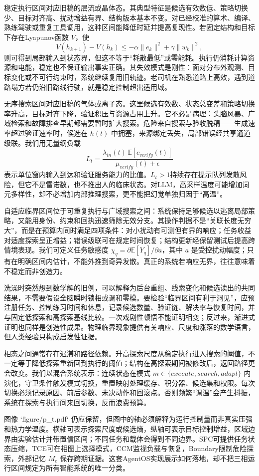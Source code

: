 稳定执行区间对应旧稿的层流或晶体态。其典型特征是候选有效数低、策略切换少、目标对齐高、扰动增益有界、结构版本基本不变。对已经校准的算术、编译、熟练驾驶或重复工具调用，这种区间能降低时延并提高复现性。若固定结构和目标下存在Lyapunov函数 $V$，使
\[
 V(h_{k+1})-V(h_k)\le-\alpha\|e_k\|^2+\gamma\|w_k\|^2,
\]
则可得到局部输入到状态界，但这不等于“耗散最低”或零能耗。执行仍消耗计算资源和电能，稳定也不保证输出事实正确。其失效模式是刚性：面对分布外观测、目标变化或不可行约束时，系统继续复用旧轨迹。老司机在熟悉道路上高效，遇到道路塌方若仍沿旧路线行驶，就是稳定控制超出适用域。

无序搜索区间对应旧稿的气体或离子态。这里候选有效数、状态总变差和策略切换率升高，目标对齐下降，验证积压与资源占用上升。它不必是病理：头脑风暴、广域检索和故障排查早期都需要暂时扩大搜索。危险来自搜索与验收脱耦——生成速率超过验证速率时，候选在 $h(t)$ 中拥塞，来源绑定丢失，局部错误经共享通道级联。我们用无量纲负载
\[
 L_t=\frac{\lambda_{in}(t)\,\mathbb E[c_{verify}(t)]}{\mu_{verify}(t)+\epsilon}
\]
表示单位窗内输入到达和验证服务能力的比值。$L_t>1$持续存在提示队列发散风险，但它不是雷诺数，也不推出人的临床状态。对LLM，高采样温度可能增加词元多样性，却不必增加内部推理搜索，更不能把幻觉单独归因于“高温”。

自适应临界区间位于可重复执行与广域搜索之间：系统保持足够候选以逃离局部策略，又能用身份、约束和回执迅速筛除无效分支。其操作判据不是“关联长度无穷大”，而是在预算内同时满足四项条件：对小扰动有可测但有界的响应；任务收益对适度探索呈正增益；错误级联可在规定时间恢复；结构更新经保留测试后提高跨情境表现。我们可定义任务敏感度 $\chi_q=\partial\mathbb E[Y_q]/\partial a$，其中 $a$ 是受控扰动幅度；只有在明确区间内估计，不能外推到奇异发散。真正的系统若响应无界，往往意味着不稳定而非创造力。

洗澡时突然想到数学解的旧例，可以解释为后台重组、线索变化和候选读出的共同结果，不需要假设全脑瞬时锁相或调和零模。要检验“临界区间有利于洞见”，应预注册任务、控制练习时间和休息，记录候选数量、验证链、解决率与恢复时间，并与固定低探索和高探索基线比较。一次戏剧性顿悟不能证明相变；反过来，渐进式证明也同样是创造性成果。物理临界现象提供有关响应、尺度和涨落的数学语言，但人类经验只构成启发性证据。

相态之间通常存在迟滞和路径依赖。升高探索尺度从稳定执行进入搜索的阈值，不一定等于降低探索重新回到执行的阈值；结构在高探索期间被修改后，返回路径更会改变。我们以混合系统表示：连续状态在模式 $m\in\{execute,search,adapt\}$ 内演化，守卫条件触发模式切换，重置映射处理缓存、积分器、候选集和权限。每次切换必须记录原因、前后参数、未决动作和回滚点。否则频繁“调温”会产生抖振，系统在探索与执行间来回切换，反而浪费预算。

图像 `figure/p_t.pdf` 仍应保留，但图中的轴必须解释为运行控制量而非真实压强和热力学温度。横轴可表示探索尺度或候选熵，纵轴可表示目标控制增益，区域边界由实验估计并带置信区间；不同任务和载体会得到不同边界。SPC可提供任务状态压缩，TCE可在相图上选择模式，CCM监视负载与恢复，Boundary限制危险探索，外部记忆 $M_e$ 保存跨期证据。这套AgentOS实现展示如何落地，却不把三相运行区间规定为所有智能系统的唯一分类。


